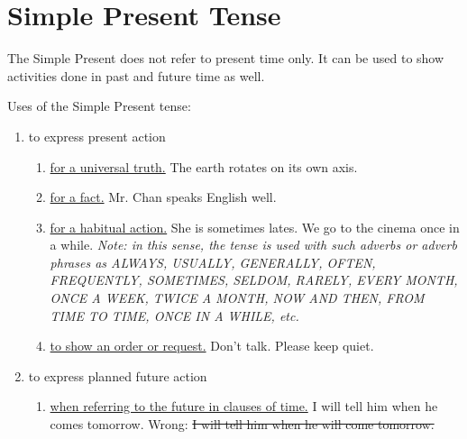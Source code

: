 \section{Simple Present Tense}
The Simple Present does not refer to present time only.
It can be used to show activities done in past and future time as well.

Uses of the Simple Present tense:
\begin{enumerate}
    \item to express present action
        \begin{enumerate}
            \item \underline{for a universal truth.}
                \newline
                The earth rotates on its own axis.
            \item \underline{for a fact.}
                \newline
                Mr. Chan speaks English well.
            \item \underline{for a habitual action.}
                \newline
                She is sometimes lates.
                \newline
                We go to the cinema once in a while.
                \newline
                \textit{Note: in this sense, the tense is used with such adverbs
                or adverb phrases as ALWAYS, USUALLY, GENERALLY, OFTEN,
                FREQUENTLY, SOMETIMES, SELDOM, RARELY, EVERY MONTH, ONCE A WEEK,
                TWICE A MONTH, NOW AND THEN, FROM TIME TO TIME, ONCE IN A WHILE,
                etc.}
            \item \underline{to show an order or request.}
                \newline
                Don't talk.
                \newline
                Please keep quiet.
        \end{enumerate}
    \item to express planned future action
        \begin{enumerate}
            \item \underline{when referring to the future in clauses of time.}
                \newline
                I will tell him when he comes tomorrow.
                \newline
                Wrong: \st{I will tell him when he will come tomorrow.}
                \newline

\end{enumerate}
\end{enumerate}
